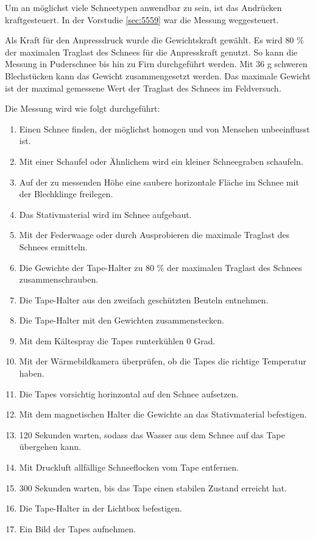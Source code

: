 

Um an möglichst viele Schneetypen anwendbar zu sein, ist das Andrücken kraftgesteuert. In der Vorstudie \ref{sec:5559} war die Messung weggesteuert.

Als Kraft für den Anpressdruck wurde die Gewichtskraft gewählt. Es wird 80 \% der maximalen Traglast des Schnees für die Anpresskraft genutzt. So kann die Messung in Puderschnee bis hin zu Firn durchgeführt werden. Mit 36 g schweren Blechstücken kann das Gewicht zusammengesetzt werden. Das maximale Gewicht ist der maximal gemessene Wert der Traglast des Schnees im Feldversuch.

Die Messung wird wie folgt durchgeführt:

\begin{enumerate}
\item Einen Schnee finden, der möglichst homogen und von Menschen unbeeinflusst ist.
\item Mit einer Schaufel oder Ähnlichem wird ein kleiner Schneegraben schaufeln.
\item Auf der zu messenden Höhe eine saubere horizontale Fläche im Schnee mit der Blechklinge freilegen.
\item Das Stativmaterial wird im Schnee aufgebaut.
\item Mit der Federwaage oder durch Ausprobieren die maximale Traglast des Schnees ermitteln.
\item Die Gewichte der Tape-Halter zu 80 \% der maximalen Traglast des Schnees zusammenschrauben.
\item Die Tape-Halter aus den zweifach geschützten Beuteln entnehmen.
\item Die Tape-Halter mit den Gewichten zusammenstecken.
\item Mit dem Kältespray die Tapes runterkühlen 0 Grad.
\item Mit der Wärmebildkamera überprüfen, ob die Tapes die richtige Temperatur haben.
\item Die Tapes vorsichtig horinzontal auf den Schnee aufsetzen.
\item Mit dem magnetischen Halter die Gewichte an das Stativmaterial befestigen.
\item 120 Sekunden warten, sodass das Wasser aus dem Schnee auf das Tape übergehen kann.
\item Mit Druckluft allfällige Schneeflocken vom Tape entfernen.
\item 300 Sekunden warten, bis das Tape einen stabilen Zustand erreicht hat.
\item Die Tape-Halter in der Lichtbox befestigen.
\item Ein Bild der Tapes aufnehmen.
\end{enumerate}
